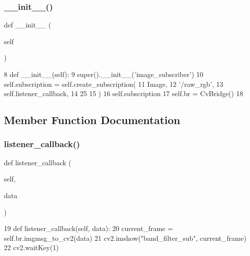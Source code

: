 \subsubsection{\texorpdfstring{\+\_\+\+\_\+init\+\_\+\+\_\+()}{\_\_init\_\_()}}
{\footnotesize\ttfamily def \+\_\+\+\_\+init\+\_\+\+\_\+ (\begin{DoxyParamCaption}\item[{}]{self }\end{DoxyParamCaption})}


\begin{DoxyCode}
8   \textcolor{keyword}{def }\_\_init\_\_(self):
9     super().\_\_init\_\_(\textcolor{stringliteral}{'image\_subscriber'})
10     self.subscription = self.create\_subscription(
11       Image, 
12       \textcolor{stringliteral}{'/raw\_rgb'}, 
13       self.listener\_callback, 
14       25
15       )
16     self.subscription
17     self.br = CvBridge()
18    
\end{DoxyCode}


\subsection{Member Function Documentation}
\mbox{\label{classtoxic__vision_1_1webcam__sub_1_1ImageSubscriber_a23dd9943cb7cb7be2a6e7022a85a1684}} 
\subsubsection{\texorpdfstring{listener\+\_\+callback()}{listener\_callback()}}
{\footnotesize\ttfamily def listener\+\_\+callback (\begin{DoxyParamCaption}\item[{}]{self,  }\item[{}]{data }\end{DoxyParamCaption})}


\begin{DoxyCode}
19   \textcolor{keyword}{def }listener\_callback(self, data):
20     current\_frame = self.br.imgmsg\_to\_cv2(data)
21     cv2.imshow(\textcolor{stringliteral}{"band\_filter\_sub"}, current\_frame)
22     cv2.waitKey(1)
\end{DoxyCode}


